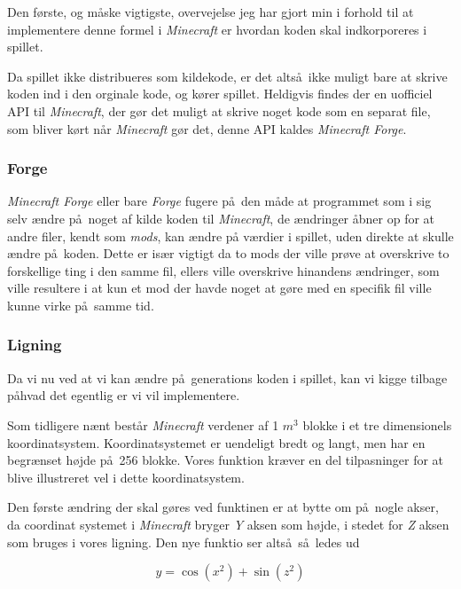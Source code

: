 \documentclass[a4paper,12pt]{report}
\begin{document}
		

		Den f\o rste, og m\aa ske vigtigste, overvejelse jeg har gjort min i forhold til at implementere denne formel i \emph{Minecraft}
		er hvordan koden skal indkorporeres i spillet.

		Da spillet ikke distribueres som kildekode, er det alts\aa \ ikke muligt bare at skrive koden ind i den orginale kode, og k\o rer spillet.
		Heldigvis findes der en uofficiel API til \emph{Minecraft}, der g\o r det muligt at skrive noget kode som en separat file, som bliver k\o rt
		n\aa r \emph{Minecraft} g\o r det, denne API kaldes \emph{Minecraft Forge}.

		\subsubsection{Forge}
		\emph{Minecraft Forge} eller bare \emph{Forge} fugere p\aa \ den m\aa de at programmet som i sig selv \ae ndre p\aa \ noget af
		kilde koden til \emph{Minecraft}, de \ae ndringer \aa bner op for at andre filer, kendt som \emph{mods}, kan \ae ndre p\aa
		v\ae rdier i spillet, uden direkte at skulle \ae ndre p\aa \ koden. Dette er is\ae r vigtigt da to mods der ville pr\o ve at overskrive
		to forskellige ting i den samme fil, ellers ville overskrive hinandens \ae ndringer, som ville resultere i at kun et mod der havde noget
		at g\o re med en specifik fil ville kunne virke p\aa \ samme tid.

		\subsubsection{Ligning}
		Da vi nu ved at vi kan \ae ndre p\aa \ generations koden i spillet, kan vi kigge tilbage p\aa hvad det egentlig er vi vil implementere.

		Som tidligere n\ae nt best\aa r \emph{Minecraft} verdener af 1 \(m^3\) blokke i et tre dimensionels koordinatsystem. Koordinatsystemet
		er uendeligt bredt og langt, men har en begr\ae nset h\o jde p\aa \ 256 blokke.
		Vores funktion kr\ae ver en del tilpasninger for at blive illustreret vel i dette koordinatsystem.

		Den f\o rste \ae ndring der skal g\o res ved funktinen er at bytte om p\aa \ nogle akser,
		da coordinat systemet i \emph{Minecraft} bryger \emph{Y} aksen som h\o jde, i stedet for \emph{Z} aksen som bruges
		i vores ligning. Den nye funktio ser alts\aa \ s\aa \ ledes ud

		\[y = \cos (x^2) + \sin (z^2)\]
\end{document}
